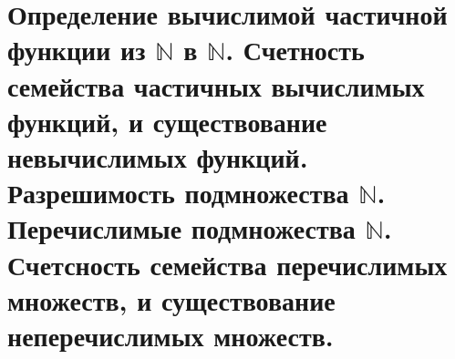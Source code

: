 \section{Определение вычислимой частичной функции из $\mathbb{N}$ в $\mathbb{N}$. Счетность семейства частичных вычислимых функций, и существование невычислимых функций. Разрешимость подмножества $\mathbb{N}$. Перечислимые подмножества $\mathbb{N}$. Счетсность семейства перечислимых множеств, и существование неперечислимых множеств.}




